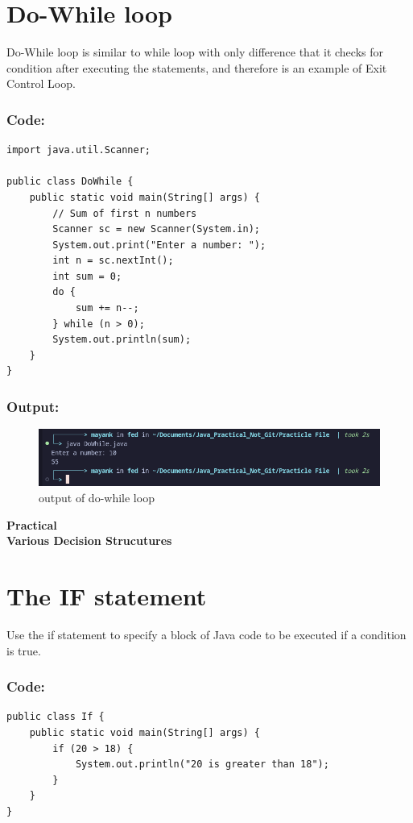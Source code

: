 \documentclass[a4paper,12pt]{article}
\newcounter{practicalno} %
\newcommand{\practicaltitle}[1]{
    \stepcounter{practicalno} %
    \newpage
    \begin{center}
        \vspace{1cm}
        \Large\textbf{Practical \thepracticalno} \\
        \vspace{0.5cm}
        \Large\textbf{#1} %
        \normalsize\vspace{1cm}
    \end{center}
}
\begin{document}
\section{Do-While loop}
Do-While loop is similar to while loop with only difference that it checks for condition
after executing the statements, and therefore is an example of Exit Control Loop.
\subsubsection{Code: }
\begin{lstlisting}
import java.util.Scanner;

public class DoWhile {
    public static void main(String[] args) {
        // Sum of first n numbers
        Scanner sc = new Scanner(System.in);
        System.out.print("Enter a number: ");
        int n = sc.nextInt();
        int sum = 0;
        do {
            sum += n--;
        } while (n > 0);
        System.out.println(sum);
    }
}
\end{lstlisting}
\subsubsection{Output: }
\begin{figure}[H]
    \centering
    \includegraphics[width=0.9\linewidth]{images/image.png}
    \caption{output of do-while loop}
    \label{fig:sample_image}
\end{figure}

\setcounter{section}{0}

\practicaltitle{Various Decision Strucutures}

\section{The IF statement}
Use the if statement to specify a block of Java code to be executed if a condition is true.
\subsubsection{Code: }
\begin{lstlisting}
public class If {
    public static void main(String[] args) {
        if (20 > 18) {
            System.out.println("20 is greater than 18");
        }
    }
}    
\end{lstlisting}
\end{document}
